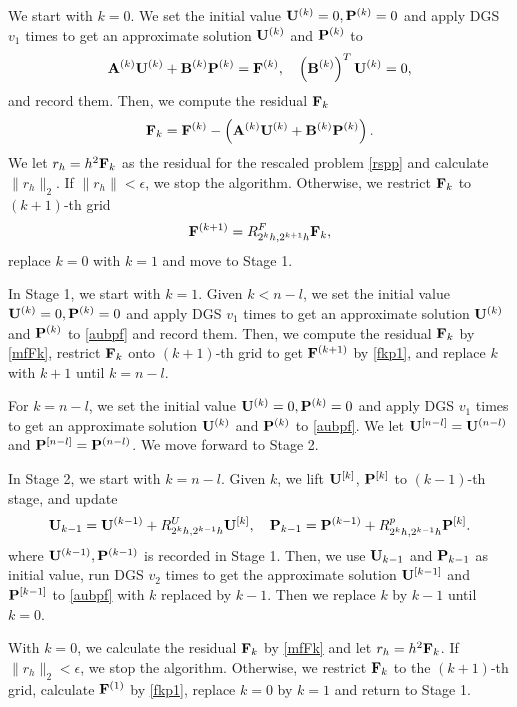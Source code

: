 \documentclass[english]{pkupaper}
\newenvironment{eqt}{\begin{equation}\begin{aligned}}{\end{aligned}\end{equation}}
\begin{document}
We start with $k=0$. We set the initial value $\mathbf{U}^{(k)}=0, \mathbf{P}^{(k)}=0$ and apply DGS $v_1$ times to get an approximate solution $\mathbf{U}^{(k)}$ and $\mathbf{P}^{(k)}$ to 
\begin{eqt}
\label{aubpf}
\mfA^{(k)} \mfU^{(k)}+\mfB^{(k)}\mfP^{(k)}=\mfF^{(k)}, \quad \lp\mfB^{(k)}\rp^T\mfU^{(k)}=0,
\end{eqt}
and record them. Then, we compute the residual $\mathbf{F}_k$
\begin{eqt}
\label{mfFk}
\mfF_k=\mfF^{(k)}-\lp\mfA^{(k)} \mfU^{(k)}+\mfB^{(k)}\mfP^{(k)}\rp.
\end{eqt}
We let $r_h=h^2\mathbf{F}_k$ as the residual for the rescaled problem \ref{rspp} and calculate $\|r_h\|_2$. If $\|r_h\|<\epsilon$, we stop the algorithm. Otherwise, we restrict $\mathbf{F}_k$ to $(k+1)$-th grid 
\begin{eqt}
\label{fkp1}
\mfF^{(k+1)}=R_{2^kh,2^{k+1}h}^F\mfF_k,
\end{eqt}
replace $k=0$ with $k=1$ and move to Stage 1. 

In Stage 1, we start with $k=1$. Given $k<n-l$, we set the initial value $\mathbf{U}^{(k)}=0, \mathbf{P}^{(k)}=0$ and apply DGS $v_1$ times to get an approximate solution $\mathbf{U}^{(k)}$ and $\mathbf{P}^{(k)}$ to \ref{aubpf} and record them. Then, we compute the residual $\mathbf{F}_k$ by \ref{mfFk}, restrict $\mathbf{F}_k$ onto $(k+1)$-th grid to get $\mathbf{F}^{(k+1)}$ by \ref{fkp1}, and replace $k$ with $k+1$ until $k=n-l$. 

For $k=n-l$, we set the initial value $\mathbf{U}^{(k)}=0, \mathbf{P}^{(k)}=0$ and apply DGS $v_1$ times to get an approximate solution $\mathbf{U}^{(k)}$ and $\mathbf{P}^{(k)}$ to \ref{aubpf}. We let $\mathbf{U}^{[n-l]}=\mathbf{U}^{(n-l)}$ and $\mathbf{P}^{[n-l]}=\mathbf{P}^{(n-l)}$. We move forward to Stage 2. 

In Stage 2, we start with $k=n-l$. Given $k$, we lift $\mathbf{U}^{[k]}$, $\mathbf{P}^{[k]}$ to $(k-1)$-th stage, and update
\begin{eqt}
\mfU_{k-1}=\mfU^{(k-1)}+R_{2^kh,2^{k-1}h}^U\mfU^{[k]},\quad  \mfP_{k-1}=\mfP^{(k-1)}+R_{2^kh,2^{k-1}h}^p\mfP^{[k]}.
\end{eqt}
where $\mathbf{U}^{(k-1)}, \mathbf{P}^{(k-1)}$ is recorded in Stage 1. Then, we use $\mathbf{U}_{k-1}$ and $\mathbf{P}_{k-1}$ as initial value, run DGS $v_2$ times to get the approximate solution $\mathbf{U}^{[k-1]}$ and $\mathbf{P}^{[k-1]}$ to \ref{aubpf} with $k$ replaced by $k-1$. Then we replace $k$ by $k-1$ until $k=0$. 

With $k=0$, we calculate the residual $\mathbf{F}_k$ by \ref{mfFk} and let $r_h=h^2 \mathbf{F}_k$. If $\|r_h\|_2<\epsilon$, we stop the algorithm. Otherwise, we restrict $\mathbf{F}_k$ to the $(k+1)$-th grid, calculate $\mathbf{F}^{(1)}$ by \ref{fkp1}, replace $k=0$ by $k=1$ and return to Stage 1.
\end{document}
